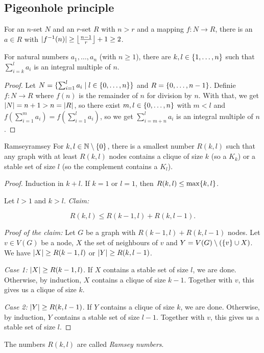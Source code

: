 \documentclass[language=english]{../../Template/TemplateLecture}
\begin{document}
\subsection{Pigeonhole principle}
For an $n$-set $N$ and an $r$-set $R$ with $n > r$ and a mapping $f: N \to R$, there is an $a \in R$ with $\abs{f^{-1}(n)} \geq \floor*{\frac{n-1}{r}} + 1 \geq 2$.

\begin{beispiel}
    For natural numbers $a_1, \ldots, a_n$ (with $n \geq 1$), there are $k, l \in \set{1,\ldots,n}$ such that $\sum_{i = k}^l a_i$ is an integral multiple of $n$.
    \begin{proof}
        Let $N = \set{\sum_{i = 1}^l a_i \mid l \in \set{0,\ldots,n}}$ and $R = \set{0,\ldots,n-1}$. Definie $f: N \to R$ where $f(n)$ is the remainder of $n$ for division by $n$. With that, we get $\abs{N} = n + 1 > n = \abs{R}$, so there exist $m,l \in \set{0,\ldots,n}$ with $m < l$ and $f\left(\sum_{i = 1}^m a_i\right) = f\left(\sum_{i = 1}^l a_i\right)$, so we get $\sum_{i = m + n}^l a_i$ is an integral multiple of $n$.
    \end{proof}
\end{beispiel}

\begin{thm}{Ramsey}{ramsey}
    For $k, l \in \IN \setminus \set{0}$, there is a smallest number $R(k,l)$ such that any graph with at least $R(k,l)$ nodes contains a clique of size $k$ (so a $K_k$) or a stable set of size $l$ (so the complement contains a $K_l$).
\end{thm}
\begin{proof}
    Induction in $k+l$. If $k = 1$ or $l = 1$, then $R(k,l) \leq \max\set{k,l}$. 
    
    Let $l > 1$ and $k > l$. \emph{Claim:} 
    
    \begin{equation}
        R(k,l) \leq R(k-1,l) + R(k,l-1).\label{eq:ramseyIneq}
    \end{equation}
    
    \emph{Proof of the claim:} Let $G$ be a graph with $R(k-1,l) + R(k,l-1)$ nodes. Let $v \in V(G)$ be a node, $X$ the set of neighbours of $v$ and $Y = V(G) \setminus (\set{v} \cup X)$. We have $\abs{X} \geq R(k-1,l)$ or $\abs{Y} \geq R(k,l-1)$.

    \emph{Case 1:} $\abs{X} \geq R(k-1,l)$. If $X$ contains a stable set of size $l$, we are done. Otherwise, by induction, $X$ contains a clique of size $k-1$. Together with $v$, this gives us a clique of size $k$.

    \emph{Case 2:} $\abs{Y} \geq R(k,l-1)$. If $Y$ contains a clique of size $k$, we are done. Otherwise, by induction, $Y$ contains a stable set of size $l-1$. Together with $v$, this gives us a stable set of size $l$.
\end{proof}
The numbers $R(k,l)$ are called \emph{Ramsey numbers}.
\end{document}
